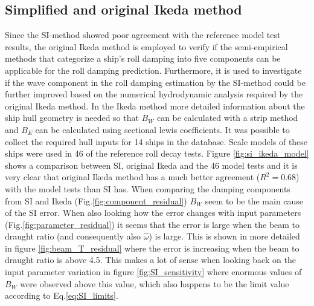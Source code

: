 \subsection{Simplified and original Ikeda method}
\label{se:si_ikeda_model}
Since the SI-method showed poor agreement with the reference model test results, the original Ikeda method is employed to verify if the semi-empirical methods that categorize a ship's roll damping into five components can be applicable for the roll damping prediction. Furthermore, it is used to investigate if the wave component in the roll damping estimation by the SI-method could be further improved based on the numerical hydrodynamic analysis required by the original Ikeda method. In the Ikeda method more detailed information about the ship hull geometry is needed so that $B_W$ can be calculated with a strip method and $B_E$ can be calculated using sectional lewis coefficients. It was possible to collect the required hull inputs for 14 ships in the database. Scale models of these ships were used in 46 of the reference roll decay tests.
Figure \ref{fig:si_ikeda_model} shows a comparison between SI, original Ikeda and the 46 model tests and it is very clear that original Ikeda method has a much better agreement ($R^2=0.68$) with the model tests than SI has. When comparing the damping components from SI and Ikeda (Fig.\ref{fig:component_residual}) $B_W$ seem to be the main cause of the SI error. When also looking how the error changes with input parameters (Fig.\ref{fig:parameter_residual}) it seems that the error is large when the beam to draught ratio (and consequently also $\hat{\omega}$) is large. This is shown in more detailed in figure \ref{fig:beam_T_residual} where the error is increasing when the beam to draught ratio is above 4.5. This makes a lot of sense when looking back on the input parameter variation in figure \ref{fig:SI_sensitivity} where enormous values of $B_W$ were observed above this value, which also happens to be the limit value according to Eq.\ref{eq:SI_limits}.

